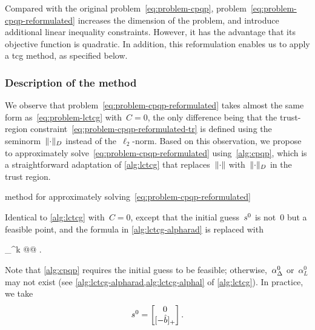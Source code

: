 Compared with the original problem~\cref{eq:problem-cpqp}, problem~\cref{eq:problem-cpqp-reformulated} increases the dimension of the problem, and introduce additional linear inequality constraints.
However, it has the advantage that its objective function is quadratic.
In addition, this reformulation enables us to apply a \gls{tcg} method, as specified below.

\subsubsection{Description of the  method}

We observe that problem~\cref{eq:problem-cpqp-reformulated} takes almost the same form as~\cref{eq:problem-lctcg} with~$C = 0$, the only difference being that the trust-region constraint~\cref{eq:problem-cpqp-reformulated-tr} is defined using the seminorm~$\lVert\cdot\rVert_D$ instead of the~$\ell_2$-norm.
Based on this observation, we propose to approximately solve~\cref{eq:problem-cpqp-reformulated} using~\cref{alg:cpqp}, which is a straightforward adaptation of \cref{alg:lctcg} that replaces~$\lVert\cdot\rVert$ with~$\lVert\cdot\rVert_D$ in the trust region.

\begin{algorithm}
    \caption{ method for approximately solving~\cref{eq:problem-cpqp-reformulated}}
    \label{alg:cpqp}
    \DontPrintSemicolon
    \onehalfspacing
    \nonl Identical to \cref{alg:lctcg} with~$C = 0$, except that the initial guess~$\sstep[0]$ is not~$0$ but a feasible point, and the formula in \cref{alg:lctcg-alpharad} is replaced with
    \begin{algomathdisplay}
        \alpha_{\rad}^k \gets \argmax @@ .
    \end{algomathdisplay}
\end{algorithm}

Note that \cref{alg:cpqp} requires the initial guess to be feasible; otherwise,~$\alpha_{\rad}^0$ or~$\alpha_L^0$ may not exist (see \cref{alg:lctcg-alpharad,alg:lctcg-alphal} of \cref{alg:lctcg}).
In practice, we take
\begin{equation*}
    \sstep[0] =
    \begin{bmatrix}
        0\\
        \posp{-\hat{b}}
    \end{bmatrix}.
\end{equation*}


